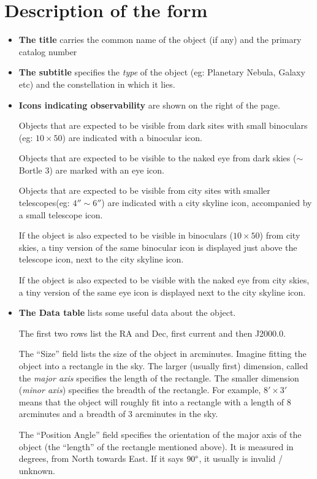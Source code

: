 \section{Description of the form}
\begin{itemize}
\item \textbf{The title} carries the common name of the object (if
  any) and the primary catalog number
\item \textbf{The subtitle} specifies the \emph{type} of the object
  (eg: Planetary Nebula, Galaxy etc) and the constellation in which it
  lies.
\item \textbf{Icons indicating observability} are shown on the right
  of the page.

  Objects that are expected to be visible from dark sites with small
  binoculars (eg: $10 \times 50$) are indicated with a binocular
  icon.

  Objects that are expected to be visible to the naked eye from dark
  skies ($\sim$ Bortle 3) are marked with an eye icon.

  Objects that are expected to be visible from city sites with smaller
  telescopes(eg: $4'' \sim 6''$) are indicated with a city skyline
  icon, accompanied by a small telescope icon.

  If the object is also expected to be visible in binoculars ($10
  \times 50$) from city skies, a tiny version of the same binocular
  icon is displayed just above the telescope icon, next to the city
  skyline icon.

  If the object is also expected to be visible with the naked eye from
  city skies, a tiny version of the same eye icon is displayed next to
  the city skyline icon.

\item \textbf{The Data table} lists some useful data about the
  object. 

  The first two rows list the RA and Dec, first current and then
  J2000.0.

  The ``Size'' field lists the size of the object in
  arcminutes. Imagine fitting the object into a rectangle in the
  sky. The larger (usually first) dimension, called the \emph{major
    axis} specifies the length of the rectangle. The smaller dimension
  (\emph{minor axis}) specifies the breadth of the rectangle. For
  example, $8' \times 3'$ means that the object will roughly fit into
  a rectangle with a length of $8$ arcminutes and a breadth of $3$
  arcminutes in the sky.

  The ``Position Angle'' field specifies the orientation of the major
  axis of the object (the ``length'' of the rectangle mentioned
  above). It is measured in degrees, from North towards East. If it
  says $90\degree$, it usually is invalid / unknown.


\end{itemize}
